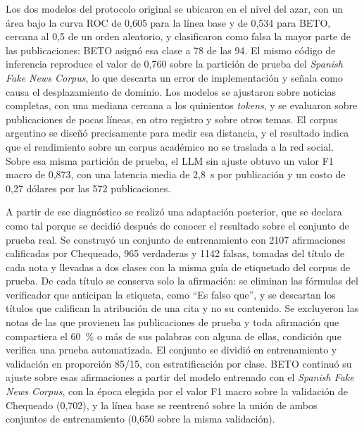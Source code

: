 Los dos modelos del protocolo original se ubicaron en el nivel del azar, con un área bajo la curva ROC de 0,605 para la línea base y de 0,534 para BETO, cercana al 0,5 de un orden aleatorio, y clasificaron como falsa la mayor parte de las publicaciones: BETO asignó esa clase a 78 de las 94. El mismo código de inferencia reproduce el valor de 0,760 sobre la partición de prueba del \textit{Spanish Fake News Corpus}, lo que descarta un error de implementación y señala como causa el desplazamiento de dominio. Los modelos se ajustaron sobre noticias completas, con una mediana cercana a los quinientos \textit{tokens}, y se evaluaron sobre publicaciones de pocas líneas, en otro registro y sobre otros temas. El corpus argentino se diseñó precisamente para medir esa distancia, y el resultado indica que el rendimiento sobre un corpus académico no se traslada a la red social. Sobre esa misma partición de prueba, el LLM sin ajuste obtuvo un valor F1 macro de 0,873, con una latencia media de 2,8~s por publicación y un costo de 0,27 dólares por las 572 publicaciones.

A partir de ese diagnóstico se realizó una adaptación posterior, que se declara como tal porque se decidió después de conocer el resultado sobre el conjunto de prueba real. Se construyó un conjunto de entrenamiento con 2107 afirmaciones calificadas por Chequeado, 965 verdaderas y 1142 falsas, tomadas del título de cada nota y llevadas a dos clases con la misma guía de etiquetado del corpus de prueba. De cada título se conserva solo la afirmación: se eliminan las fórmulas del verificador que anticipan la etiqueta, como \enquote{Es falso que}, y se descartan los títulos que califican la atribución de una cita y no su contenido. Se excluyeron las notas de las que provienen las publicaciones de prueba y toda afirmación que compartiera el 60~\% o más de sus palabras con alguna de ellas, condición que verifica una prueba automatizada. El conjunto se dividió en entrenamiento y validación en proporción 85/15, con estratificación por clase. BETO continuó su ajuste sobre esas afirmaciones a partir del modelo entrenado con el \textit{Spanish Fake News Corpus}, con la época elegida por el valor F1 macro sobre la validación de Chequeado (0,702), y la línea base se reentrenó sobre la unión de ambos conjuntos de entrenamiento (0,650 sobre la misma validación).

